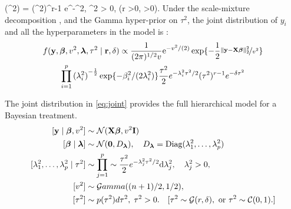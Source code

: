 \documentclass[10pt]{article}
\begin{document}
\beq
\pi(\tau^2) =  (\tau^2)^{r-1} e^{-\delta \tau^2}, \; \tau^2 > 0, \; (r >0, \delta >0).
\eeq
Under the scale-mixture decomposition \label{eq:v_i}, and the Gamma hyper-prior on $\tau^2$, the joint distribution of $y_i$ and all the hyperparameters in the model is :
\begin{multline}
f({\bf y}, \boldsymbol{\beta}, v^2, \boldsymbol{\lambda}, \tau^2 \mid {\bf r}, \delta) \propto 
\frac{1}{(2 \pi)^{1/2} v} {\rm e}^{-{v^2}/({2})} \exp\{- \frac{1}{2} \nicefrac{\lVert{\bf y} - {\bf X} \boldsymbol{\beta}\rVert_2^2 }{v^2}\} \\
\prod_{i=1}^{p} {(\lambda_i^2)}^{-\frac{1}{2}} \exp\{-\beta_i^2/(2\lambda_i^2)\} \frac{\tau^2}{2} e^{-\lambda_i^2\tau^2/2} (\tau^2)^{r-1} e^{-\delta \tau^2} \label{eq:joint}
\end{multline}

The joint distribution in \eqref{eq:joint} provides the full hierarchical model for a Bayesian treatment. 
\begin{align}\label{sq_lasso_h}
[\y \mid \bbeta, v^2] & \sim \NormRV(\X \bbeta, v^2 \I) \\
[\bbeta \mid \blambda] & \sim \NormRV(\0, D_{\blambda}), \quad D_{\blambda} = \text{Diag}(\lambda_1^2, \ldots, \lambda_p^2) \\
[\lambda_1^2, \ldots, \lambda_p^2 \mid \tau^2] & \sim \prod_{j=1}^{p} \sim \frac{\tau^2}{2} e^{-\lambda_j^2\tau^2/2} \d \lambda_j^2, \quad \lambda_j^2 > 0, \\
[v^2] & \sim \mathcal{G}amma((n+1)/2 , 1/2),  \\
[\tau^2] & \sim p(\tau^2) d\tau^2,  \; \tau^2 > 0. \quad [ \tau^2 \sim \GammaRV(r, \delta), \text{ or } \tau^2 \sim \CauchyRV(0,1). ]
\end{align}


\end{document}
